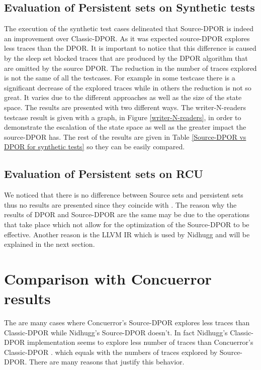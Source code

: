 \subsection{Evaluation of Persistent sets on Synthetic tests}
The execution of the synthetic test cases delineated that Source-DPOR is indeed an improvement over Classic-DPOR. As it was expected source-DPOR explores less 
traces than the DPOR. It is important
to notice that this difference is caused by the sleep set blocked traces that are produced by the DPOR algorithm that are omitted by the source DPOR. 
The reduction in the number of traces explored is not the same of all the testcases. For example in some testcase there is a
significant decrease of the explored traces while in others the reduction is not so great. 
It varies due to the different approaches as well as the size of the state space. The results are presented with two different ways. 
The writer-N-readers testcase result is given with a graph, in Figure \ref{writer-N-readers}, in order to demonstrate the escalation of the state space as well as the greater impact the source-DPOR has. The rest of the
results are given in Table \ref{Source-DPOR vs DPOR for synthetic tests} so they can be easily compared.



\subsection{Evaluation of Persistent sets on RCU}
We noticed that there is no difference between Source sets and persistent sets thus no results are presented since they coincide with \cite{Spin}. 
The reason why the results of DPOR and Source-DPOR are the same may be due to the operations that take place which not allow for the optimization of the Source-DPOR 
to be effective. Another reason is the LLVM IR which is used by Nidhugg and will be explained in the next section.

\section{Comparison with Concuerror results}
The are many cases where Concuerror's Source-DPOR explores less traces than Classic-DPOR while Nidhugg's Source-DPOR doesn't. 
In fact Nidhugg's Classic-DPOR implementation seems to explore less number of traces than Concuerror's Classic-DPOR \cite{AbdullaAronisJohnssonSagonasDPOR2014}.
which equals with the numbers of traces explored by Source-DPOR. There are many reasons that justify this behavior.


